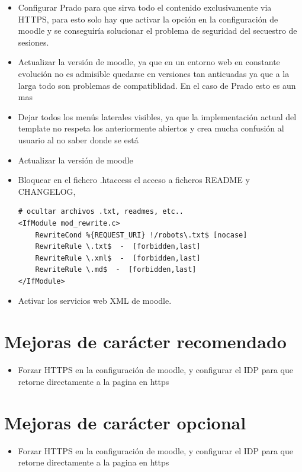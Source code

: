 \begin{itemize}
	\item Configurar Prado para que sirva todo el contenido exclusivamente via HTTPS, para esto solo hay que activar la opción en la configuración de moodle y se conseguiría solucionar el problema de seguridad del secuestro de sesiones.


	\item Actualizar la versión de moodle, ya que en un entorno web en constante evolución no es admisible quedarse en versiones tan anticuadas ya que a la larga todo son problemas de compatiblidad. En el caso de Prado esto es aun mas


	
	


	\item Dejar todos los menús laterales visibles, ya que la implementación actual del template no respeta los anteriormente abiertos y crea mucha confusión al usuario al no saber donde se está
	
	\item Actualizar la versión de moodle 
	
	\item Bloquear en el fichero .htaccess el acceso a ficheros README y CHANGELOG,


\begin{lstlisting}
# ocultar archivos .txt, readmes, etc..
<IfModule mod_rewrite.c>
    RewriteCond %{REQUEST_URI} !/robots\.txt$ [nocase]
    RewriteRule \.txt$  -  [forbidden,last]
    RewriteRule \.xml$  -  [forbidden,last]
    RewriteRule \.md$  -  [forbidden,last]
</IfModule>
\end{lstlisting}	


	\item Activar los servicios web XML de moodle.
	
\end{itemize}


\section{Mejoras de carácter recomendado}

\begin{itemize}
	\item Forzar HTTPS en la configuración de moodle, y configurar el IDP para que retorne directamente a la pagina en https
	
\end{itemize}

\section{Mejoras de carácter opcional}
\begin{itemize}
	\item Forzar HTTPS en la configuración de moodle, y configurar el IDP para que retorne directamente a la pagina en https
	
\end{itemize}
